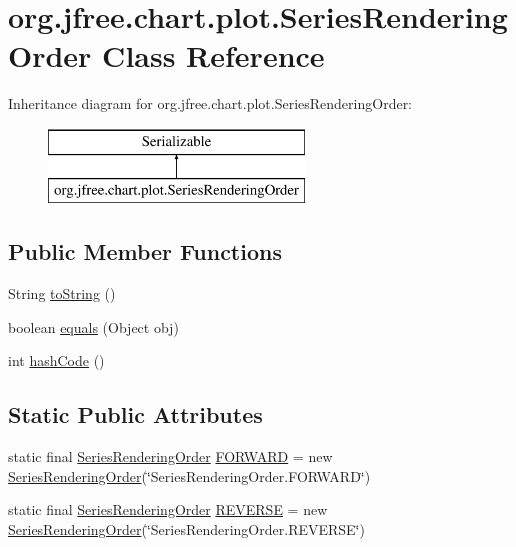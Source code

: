 \hypertarget{classorg_1_1jfree_1_1chart_1_1plot_1_1_series_rendering_order}{}\section{org.\+jfree.\+chart.\+plot.\+Series\+Rendering\+Order Class Reference}
\label{classorg_1_1jfree_1_1chart_1_1plot_1_1_series_rendering_order}
Inheritance diagram for org.\+jfree.\+chart.\+plot.\+Series\+Rendering\+Order\+:\begin{figure}[H]
\begin{center}
\leavevmode
\includegraphics[height=2.000000cm]{classorg_1_1jfree_1_1chart_1_1plot_1_1_series_rendering_order}
\end{center}
\end{figure}
\subsection*{Public Member Functions}
\begin{DoxyCompactItemize}
\item 
String \mbox{\hyperlink{classorg_1_1jfree_1_1chart_1_1plot_1_1_series_rendering_order_a067a6ec9d40a52b59508d775075343eb}{to\+String}} ()
\item 
boolean \mbox{\hyperlink{classorg_1_1jfree_1_1chart_1_1plot_1_1_series_rendering_order_a863496eca631ebf7cb1fc632d8f0c480}{equals}} (Object obj)
\item 
int \mbox{\hyperlink{classorg_1_1jfree_1_1chart_1_1plot_1_1_series_rendering_order_a95fd7e430bdfa3ae939b91862d455926}{hash\+Code}} ()
\end{DoxyCompactItemize}
\subsection*{Static Public Attributes}
\begin{DoxyCompactItemize}
\item 
static final \mbox{\hyperlink{classorg_1_1jfree_1_1chart_1_1plot_1_1_series_rendering_order}{Series\+Rendering\+Order}} \mbox{\hyperlink{classorg_1_1jfree_1_1chart_1_1plot_1_1_series_rendering_order_acca01a486085680f5082eb18b34eae63}{F\+O\+R\+W\+A\+RD}} = new \mbox{\hyperlink{classorg_1_1jfree_1_1chart_1_1plot_1_1_series_rendering_order}{Series\+Rendering\+Order}}(\char`\"{}Series\+Rendering\+Order.\+F\+O\+R\+W\+A\+RD\char`\"{})
\item 
static final \mbox{\hyperlink{classorg_1_1jfree_1_1chart_1_1plot_1_1_series_rendering_order}{Series\+Rendering\+Order}} \mbox{\hyperlink{classorg_1_1jfree_1_1chart_1_1plot_1_1_series_rendering_order_a4421c646d6a20026793d2e6f6b3a3f49}{R\+E\+V\+E\+R\+SE}} = new \mbox{\hyperlink{classorg_1_1jfree_1_1chart_1_1plot_1_1_series_rendering_order}{Series\+Rendering\+Order}}(\char`\"{}Series\+Rendering\+Order.\+R\+E\+V\+E\+R\+SE\char`\"{})
\end{DoxyCompactItemize}


